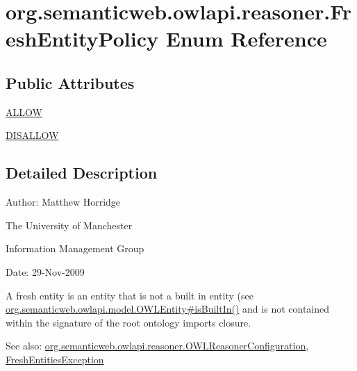 \hypertarget{enumorg_1_1semanticweb_1_1owlapi_1_1reasoner_1_1_fresh_entity_policy}{\section{org.\-semanticweb.\-owlapi.\-reasoner.\-Fresh\-Entity\-Policy Enum Reference}
\label{enumorg_1_1semanticweb_1_1owlapi_1_1reasoner_1_1_fresh_entity_policy}
}
\subsection*{Public Attributes}
\begin{DoxyCompactItemize}
\item 
\hyperlink{enumorg_1_1semanticweb_1_1owlapi_1_1reasoner_1_1_fresh_entity_policy_a8f3d06d4ac09dbdb0e9d8da43e06cfc5}{A\-L\-L\-O\-W}
\item 
\hyperlink{enumorg_1_1semanticweb_1_1owlapi_1_1reasoner_1_1_fresh_entity_policy_a762eae6d5b2449d125311ecaabfdc8d0}{D\-I\-S\-A\-L\-L\-O\-W}
\end{DoxyCompactItemize}


\subsection{Detailed Description}
Author\-: Matthew Horridge\par
 The University of Manchester\par
 Information Management Group\par
 Date\-: 29-\/\-Nov-\/2009 

A fresh entity is an entity that is not a built in entity (see \hyperlink{interfaceorg_1_1semanticweb_1_1owlapi_1_1model_1_1_o_w_l_entity_a830bbc06f2d4eaacd03b10504e79bf19}{org.\-semanticweb.\-owlapi.\-model.\-O\-W\-L\-Entity\#is\-Built\-In()} and is not contained within the signature of the root ontology imports closure. 

See also\-: \hyperlink{interfaceorg_1_1semanticweb_1_1owlapi_1_1reasoner_1_1_o_w_l_reasoner_configuration}{org.\-semanticweb.\-owlapi.\-reasoner.\-O\-W\-L\-Reasoner\-Configuration}, \hyperlink{classorg_1_1semanticweb_1_1owlapi_1_1reasoner_1_1_fresh_entities_exception}{Fresh\-Entities\-Exception} 

